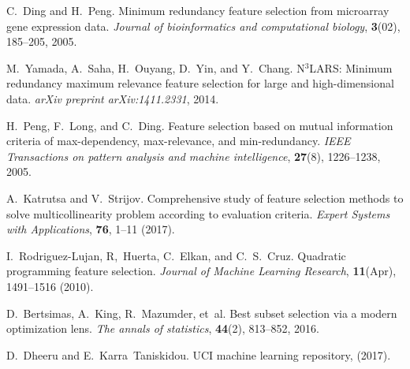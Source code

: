 \documentclass[
11pt,%
tightenlines,%
twoside,%
onecolumn,%
nofloats,%
nobibnotes,%
nofootinbib,%
superscriptaddress,%
noshowpacs,%
centertags]%
{revtex4}
\begin{document}
\begin{thebibliography}{10}
	C.~Ding and H.~Peng.
	Minimum redundancy feature selection from microarray gene expression
	data.
	{\em Journal of bioinformatics and computational biology},
	\textbf{3}(02), 185--205, 2005.
	
	M.~Yamada, A.~Saha, H.~Ouyang, D.~Yin, and Y.~Chang.
	N$^3${LARS}: Minimum redundancy maximum relevance feature selection
	for large and high-dimensional data.
	{\em arXiv preprint arXiv:1411.2331}, 2014.
	
	H.~Peng, F.~Long, and C.~Ding.
	Feature selection based on mutual information criteria of
	max-dependency, max-relevance, and min-redundancy.
	{\em IEEE Transactions on pattern analysis and machine intelligence},
	\textbf{27}(8), 1226--1238, 2005.
	
	A.~Katrutsa and V.~Strijov.
	Comprehensive study of feature selection methods to solve
	multicollinearity problem according to evaluation criteria.
	{\em Expert Systems with Applications}, \textbf{76}, 1--11 (2017).
	
	I.~Rodriguez-Lujan, R,~Huerta, C.~Elkan, and C.~S.~Cruz.
	Quadratic programming feature selection.
	{\em Journal of Machine Learning Research}, \textbf{11}(Apr), 1491--1516 (2010).
	
	D.~Bertsimas, A.~King, R.~Mazumder, et~al.
	Best subset selection via a modern optimization lens.
	{\em The annals of statistics}, \textbf{44}(2), 813--852, 2016.
	
	D.~Dheeru and E.~Karra~Taniskidou.
	{UCI} machine learning repository, (2017).

	
\end{thebibliography}
\end{document}
